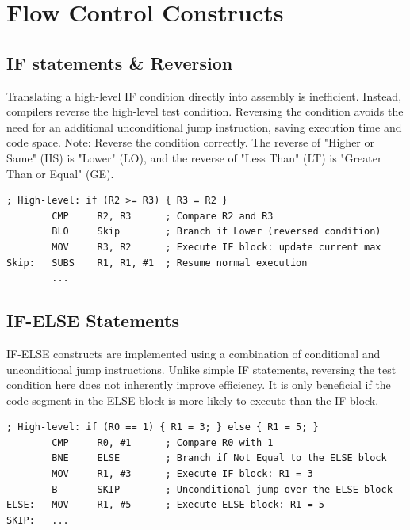 \documentclass[../comorg-part1.tex]{subfiles}
\begin{document}
\section{Flow Control Constructs}

\subsection{IF statements \& Reversion}
Translating a high-level IF condition directly into assembly is inefficient. Instead, compilers reverse the high-level test condition.\newline
Reversing the condition avoids the need for an additional unconditional jump instruction, saving execution time and code space.\newline
Note: Reverse the condition correctly. The reverse of "Higher or Same" (HS) is "Lower" (LO), and the reverse of "Less Than" (LT) is "Greater Than or Equal" (GE).

\begin{lstlisting}[language=ARM, title={Finding Largest Number: Condition Reversal}]
; High-level: if (R2 >= R3) { R3 = R2 }
        CMP     R2, R3      ; Compare R2 and R3
        BLO     Skip        ; Branch if Lower (reversed condition)
        MOV     R3, R2      ; Execute IF block: update current max
Skip:   SUBS    R1, R1, #1  ; Resume normal execution
        ...
\end{lstlisting}

\subsection{IF-ELSE Statements}
IF-ELSE constructs are implemented using a combination of conditional and unconditional jump instructions.\newline
Unlike simple IF statements, reversing the test condition here does not inherently improve efficiency.
It is only beneficial if the code segment in the ELSE block is more likely to execute than the IF block.

\begin{lstlisting}[language=ARM, title={IF-ELSE Implementation with Branching}, keepspaces=true]
; High-level: if (R0 == 1) { R1 = 3; } else { R1 = 5; }
        CMP     R0, #1      ; Compare R0 with 1
        BNE     ELSE        ; Branch if Not Equal to the ELSE block
        MOV     R1, #3      ; Execute IF block: R1 = 3
        B       SKIP        ; Unconditional jump over the ELSE block
ELSE:   MOV     R1, #5      ; Execute ELSE block: R1 = 5
SKIP:   ...
\end{lstlisting}
\end{document}
